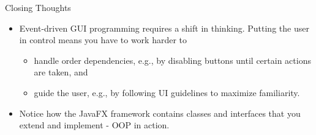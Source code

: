 \documentclass{beamer}
\begin{document}
\begin{frame}[fragile]{Closing Thoughts}


\begin{itemize}
\item Event-driven GUI programming requires a shift in thinking.  Putting the user in control means you have to work harder to
\begin{itemize}
  \item handle order dependencies, e.g., by disabling buttons until certain actions are taken, and
  \item guide the user, e.g., by following UI guidelines to maximize familiarity.
\end{itemize}
\item Notice how the JavaFX framework contains classes and interfaces that you extend and implement - OOP in action.
\end{itemize}


\end{frame}






\end{document}
